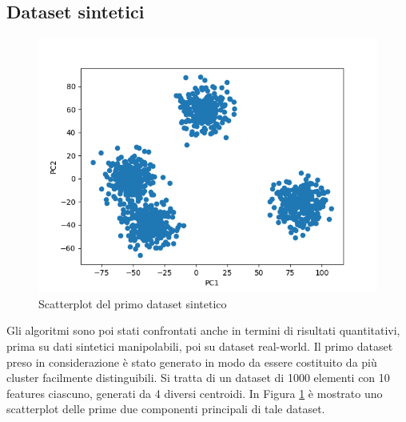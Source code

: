 \documentclass{article}
\begin{document}
\clearpage

    \subsection{Dataset sintetici}
    \begin{figure}
    \includegraphics[width=1\linewidth]{../results/plots/dataset1}
    \caption{Scatterplot del primo dataset sintetico}
    \label{sint}
    \end{figure}

    Gli algoritmi sono poi stati confrontati anche in termini di risultati quantitativi, prima su dati sintetici manipolabili, poi su dataset real-world.
    Il primo dataset preso in considerazione è stato generato in modo da essere costituito da più cluster facilmente distinguibili. Si tratta di un dataset di 1000 elementi con 10 features ciascuno, generati da 4 diversi centroidi. In Figura \ref{sint} è mostrato uno scatterplot delle prime due componenti principali di tale dataset.
\end{document}
